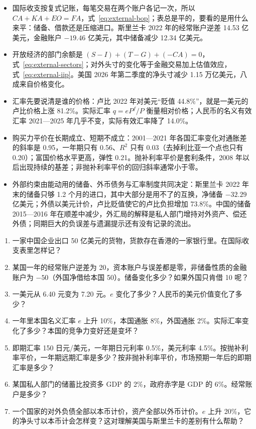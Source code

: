 \begin{takeaways}
\begin{itemize}
\item 国际收支按复式记账，每笔交易在两个账户各记一次，所以 $\mathit{CA}+\mathit{KA}+\mathit{EO}=\mathit{FA}$，式~\eqref{eq:external-bop}；表总是平的，要看的是用什么来平：储备、借款还是压缩进口。斯里兰卡 2022 年的经常账户逆差 14.53 亿美元，金融账户 $-19.46$ 亿美元，其中储备减少 12.34 亿美元。
\item 开放经济的部门余额是 $(S-I)+(T-G)+(-\mathit{CA})=0$，式~\eqref{eq:external-sectors}；对外头寸的变化等于金融交易加上估值效应，式~\eqref{eq:external-iip}。美国 2026 年第二季度的净头寸减少 1.15 万亿美元，八成来自价格变化。
\item 汇率先要说清是谁的价格：卢比 2022 年对美元“贬值 44.8\%”，就是一美元的卢比价格上涨 81.2\%。实际汇率 $q=eP^{f}/P$ 衡量相对价格；人民币的名义有效汇率 2021—2025 年几乎不变，实际有效汇率降了 14.0\%。
\item 购买力平价在长期成立、短期不成立：2001—2021 年各国汇率变化对通胀差的斜率是 0.95，一年期只有 0.56、$R^{2}$ 只有 0.03（去掉利比亚一个点也只有 0.20）；富国价格水平更高，弹性 0.21。抛补利率平价是套利条件，2008 年以后出现持续的基差；非抛补利率平价的回归斜率通常小于零。
\item 外部约束由能动用的储备、外币债务与汇率制度共同决定：斯里兰卡 2022 年末的储备只够 1.2 个月的进口，其中大部分是用不了的互换，净储备 $-32.29$ 亿美元；外债以美元计价，卢比贬值使它的卢比负担增加 73.8\%。中国的储备 2015—2016 年在顺差中减少，外汇局的解释是私人部门增持对外资产、偿还外债；同期巨大的负误差与遗漏提示还有没有记录的流出。
\end{itemize}
\end{takeaways}

\begin{selfcheck}
\begin{enumerate}
\item 一家中国企业出口 50 亿美元的货物，货款存在香港的一家银行里。在国际收支表里怎样记？
\item 某国一年的经常账户逆差为 20，资本账户与误差都是零，非储备性质的金融账户为 $-50$（外国净借给本国 50）。储备变化多少？如果外国只肯借 10 呢？
\item 一美元从 6.40 元变为 7.20 元。$e$ 变化了多少？人民币的美元价值变化了多少？
\item 一年里本国名义汇率 $e$ 上升 10\%，本国通胀 8\%，外国通胀 2\%。实际汇率变化了多少？本国的竞争力变好还是变坏？
\item 即期汇率 150 日元/美元，一年期日元利率 0.5\%，美元利率 4.5\%。按抛补利率平价，一年期远期汇率是多少？按非抛补利率平价，市场预期一年后的即期汇率是多少？
\item 某国私人部门的储蓄比投资多 GDP 的 2\%，政府赤字是 GDP 的 6\%。经常账户是多少？
\item 一个国家的对外负债全部以本币计价，资产全部以外币计价。$e$ 上升 20\%，它的净头寸以本币计会怎样变？这对理解美国与斯里兰卡的差别有什么帮助？
\end{enumerate}
\end{selfcheck}

